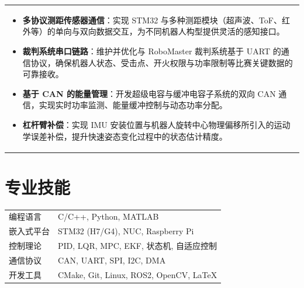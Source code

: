 \documentclass[a4paper,12pt]{article}
\begin{document}
\begin{tabularx}{\linewidth}{@{}X@{}}
\begin{itemize}[nosep,after=\strut, leftmargin=1em, itemsep=3pt,label=--]
\item \textbf{多协议测距传感器通信}：实现 STM32 与多种测距模块（超声波、ToF、红外等）的单向与双向数据交互，为不同机器人构型提供灵活的感知接口。
\item \textbf{裁判系统串口链路}：维护并优化与 RoboMaster 裁判系统基于 UART 的通信协议，确保机器人状态、受击点、开火权限与功率限制等比赛关键数据的可靠接收。
\item \textbf{基于 CAN 的能量管理}：开发超级电容与缓冲电容子系统的双向 CAN 通信，实现实时功率监测、能量缓冲控制与动态功率分配。
\item \textbf{杠杆臂补偿}：实现 IMU 安装位置与机器人旋转中心物理偏移所引入的运动学误差补偿，提升快速姿态变化过程中的状态估计精度。
\end{itemize}
\end{tabularx}


\section{专业技能}
\begin{tabularx}{\linewidth}{@{}l X@{}}
编程语言 & \normalsize{C/C++, Python, MATLAB}\\
嵌入式平台 & \normalsize{STM32 (H7/G4), NUC, Raspberry Pi}\\
控制理论 & \normalsize{PID, LQR, MPC, EKF, 状态机, 自适应控制}\\
通信协议 & \normalsize{CAN, UART, SPI, I2C, DMA}\\
开发工具 & \normalsize{CMake, Git, Linux, ROS2, OpenCV, LaTeX}\\
\end{tabularx}

\end{document}

